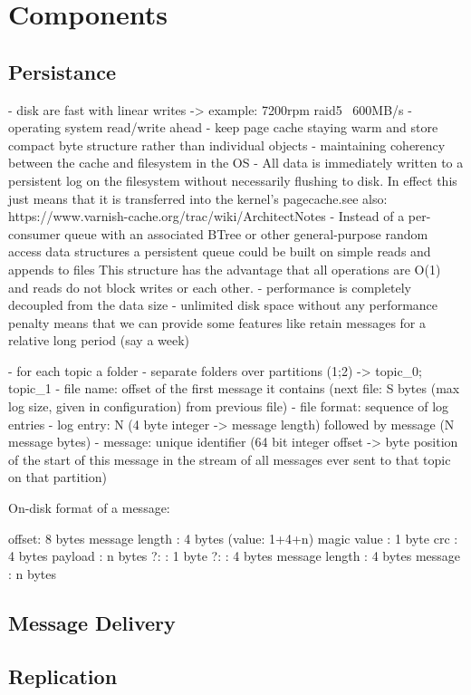 \section{Components}
\subsection{Persistance}
- disk are fast with linear writes -> example: 7200rpm raid5 ~600MB/s
- operating system read/write ahead
- keep page cache staying warm and store compact byte structure rather than individual objects
- maintaining coherency between the cache and filesystem in the OS
- All data is immediately written to a persistent log on the filesystem without necessarily flushing to disk. In effect this just means that it is transferred into the kernel's pagecache.see also: https://www.varnish-cache.org/trac/wiki/ArchitectNotes
- Instead of  a per-consumer queue with an associated BTree or other general-purpose random access data structures
  a persistent queue could be built on simple reads and appends to files
  This structure has the advantage that all operations are O(1) and reads do not block writes or each other.
- performance is completely decoupled from the data size
- unlimited disk space without any performance penalty means that we can provide some features like retain messages for a relative long period (say a week)

- for each topic a folder
- separate folders over partitions (1;2) -> topic\_0; topic\_1
- file name: offset of the first message it contains (next file: S bytes (max log size, given in configuration) from previous file)
- file format: sequence of log entries
- log entry: N (4 byte integer -> message length) followed by message (N message bytes)
- message: unique identifier (64 bit integer offset -> byte position of the start of this message in the stream of all messages ever sent to that topic on that partition)

On-disk format of a message:

offset: 8 bytes
message length : 4 bytes (value: 1+4+n) 
magic value  : 1 byte
crc            : 4 bytes
payload        : n bytes
    ?:              : 1 byte
    ?:              : 4 bytes
    message length  : 4 bytes
    message         : n bytes

\subsection{Message Delivery}

\subsection{Replication}

